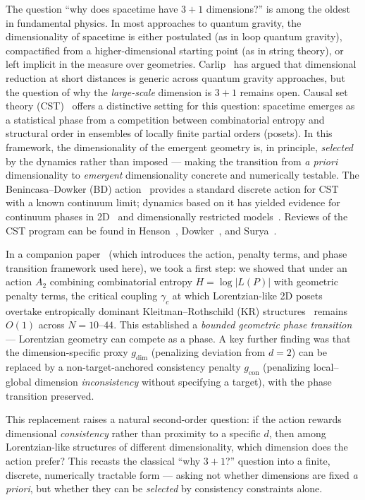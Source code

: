 \documentclass[11pt,a4paper]{article}
\begin{document}
The question ``why does spacetime have $3{+}1$ dimensions?'' is among the oldest in fundamental physics. In most approaches to quantum gravity, the dimensionality of spacetime is either postulated (as in loop quantum gravity), compactified from a higher-dimensional starting point (as in string theory), or left implicit in the measure over geometries. Carlip~\cite{carlip2017} has argued that dimensional reduction at short distances is generic across quantum gravity approaches, but the question of why the \emph{large-scale} dimension is $3{+}1$ remains open. Causal set theory (CST)~\cite{bombelli1987,sorkin2005} offers a distinctive setting for this question: spacetime emerges as a statistical phase from a competition between combinatorial entropy and structural order in ensembles of locally finite partial orders (posets). In this framework, the dimensionality of the emergent geometry is, in principle, \emph{selected} by the dynamics rather than imposed --- making the transition from \emph{a priori} dimensionality to \emph{emergent} dimensionality concrete and numerically testable. The Benincasa--Dowker (BD) action~\cite{benincasa2010} provides a standard discrete action for CST with a known continuum limit; dynamics based on it has yielded evidence for continuum phases in 2D~\cite{surya2012,loomis2018} and dimensionally restricted models~\cite{cunningham2020}. Reviews of the CST program can be found in Henson~\cite{henson2006}, Dowker~\cite{dowker2005}, and Surya~\cite{surya2019}.

In a companion paper~\cite{zhang2026companion} (which introduces the action, penalty terms, and phase transition framework used here), we took a first step: we showed that under an action $A_2$ combining combinatorial entropy $H = \log|L(P)|$ with geometric penalty terms, the critical coupling $\gamma_c$ at which Lorentzian-like 2D posets overtake entropically dominant Kleitman--Rothschild (KR) structures~\cite{kleitman1975} remains $O(1)$ across $N = 10$--$44$. This established a \emph{bounded geometric phase transition} --- Lorentzian geometry can compete as a phase. A key further finding was that the dimension-specific proxy $g_{\text{dim}}$ (penalizing deviation from $d = 2$) can be replaced by a non-target-anchored consistency penalty $g_{\text{con}}$ (penalizing local--global dimension \emph{inconsistency} without specifying a target), with the phase transition preserved.

This replacement raises a natural second-order question: if the action rewards dimensional \emph{consistency} rather than proximity to a specific $d$, then among Lorentzian-like structures of different dimensionality, which dimension does the action prefer? This recasts the classical ``why $3{+}1$?'' question into a finite, discrete, numerically tractable form --- asking not whether dimensions are fixed \emph{a priori}, but whether they can be \emph{selected} by consistency constraints alone.
\end{document}
